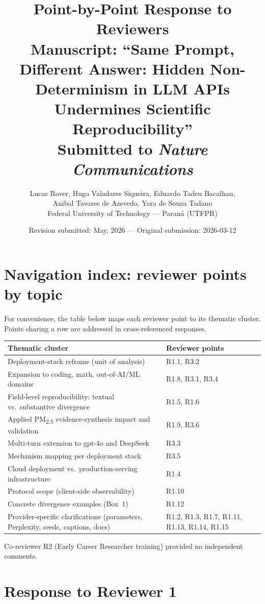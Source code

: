 \documentclass[11pt,a4paper]{article}
\title{\textbf{Point-by-Point Response to Reviewers} \\
\large Manuscript: ``Same Prompt, Different Answer: Hidden Non-Determinism in LLM APIs Undermines Scientific Reproducibility'' \\
\large Submitted to \emph{Nature Communications}}
\author{Lucas Rover, Hugo Valadares Siqueira, Eduardo Tadeu Bacalhau, \\
Anibal Tavares de Azevedo, Yara de Souza Tadano \\
Federal University of Technology --- Paraná (UTFPR)}
\date{Revision submitted: May, 2026 --- Original submission: 2026-03-12}
\begin{document}
\maketitle

\section*{Navigation index: reviewer points by topic}

\noindent For convenience, the table below maps each reviewer point to its thematic cluster. Points sharing a row are addressed in cross-referenced responses.

\begin{center}
\renewcommand{\arraystretch}{1.25}
\begin{tabular}{p{6.5cm}p{8.5cm}}
\hline
\textbf{Thematic cluster} & \textbf{Reviewer points} \\
\hline
Deployment-stack reframe (unit of analysis) & R1.1, R3.2 \\
Expansion to coding, math, out-of-AI/ML domains & R1.8, R3.1, R3.4 \\
Field-level reproducibility: textual vs.\ substantive divergence & R1.5, R1.6 \\
Applied PM\textsubscript{2.5} evidence-synthesis impact and validation & R1.9, R3.6 \\
Multi-turn extension to gpt-4o and DeepSeek & R3.3 \\
Mechanism mapping per deployment stack & R3.5 \\
Cloud deployment vs.\ production-serving infrastructure & R1.4 \\
Protocol scope (client-side observability) & R1.10 \\
Concrete divergence examples (Box~1) & R1.12 \\
Provider-specific clarifications (parameters, Perplexity, seeds, captions, docs) & R1.2, R1.3, R1.7, R1.11, R1.13, R1.14, R1.15 \\
\hline
\end{tabular}
\end{center}

\noindent Co-reviewer R2 (Early Career Researcher training) provided no independent comments.

\newpage
\section*{Response to Reviewer 1}
\end{document}
